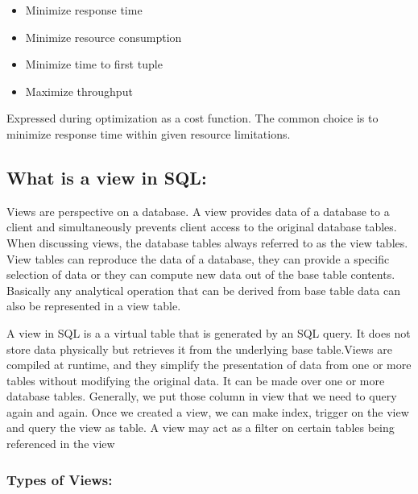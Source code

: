 \begin{itemize}
    \item Minimize response time
    \item Minimize resource consumption
    \item Minimize time to first tuple
    \item Maximize throughput
\end{itemize}\vspace{.4cm}
Expressed during optimization as a cost function. The common choice is to minimize response time within given resource limitations.



\subsection{What is a view in SQL:}
Views are perspective on a database. A view provides data of a database to a client and simultaneously prevents client access to the original database tables. When discussing views, the database tables always referred to as the view tables. View tables can reproduce the data of a database, they can provide a specific selection of data or they can compute new data out of the base table contents. Basically any analytical operation that can be derived from base table data can also be represented in a view table.\vspace{.4cm}

A view in SQL is a a virtual table that is generated by an SQL query. It does not store data physically but retrieves it from the underlying base table.Views are compiled at runtime, and they simplify the presentation of data from one or more tables without modifying the original data. It can be made over one or more database tables. Generally, we put those column in view that we need to query again and again. Once we created a view, we can make index, trigger on the view and query the view as table. A view may act as a filter on certain tables being referenced in the view \cite{chauhan-2024,Rohan_Vats-2024}

\subsubsection{Types of Views:}

